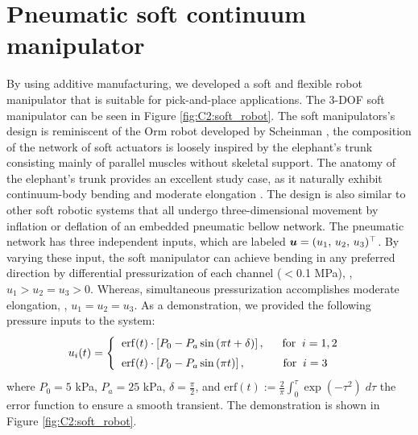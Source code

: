 \section{Pneumatic soft continuum manipulator}
By using additive manufacturing, we developed a soft and flexible robot manipulator that is suitable for pick-and-place applications. The 3-DOF soft manipulator can be seen in Figure \ref{fig:C2:soft_robot}. The soft manipulators's design is reminiscent of the Orm robot developed by Scheinman \cite{BibEntryOrm2019Sep}, the composition of the network of soft actuators is loosely inspired by the elephant's trunk consisting mainly of parallel muscles without skeletal support. The anatomy of the elephant's trunk provides an excellent study case, as it naturally exhibit continuum-body bending and moderate elongation \cite{Falkenhahn2015,Jones2006,Tatlicioglu2007}. The design is also similar to other soft robotic systems \cite{Suzumori1991,Falkenhahn2015,Drotman2017} that all undergo three-dimensional movement by inflation or deflation of an embedded pneumatic bellow network. The pneumatic network has three independent inputs, which are labeled ${\boldsymbol{u}} = (u_1,\,u_2,\,u_3)^\top$. By varying these input, the soft manipulator can achieve bending in any preferred direction by differential pressurization of each channel ($<$0.1 \si{\mega \pascal}), \eg, $u_1 > u_2 = u_3 > 0$. Whereas, simultaneous pressurization accomplishes moderate elongation, \ie, $u_1 = u_2 = u_3$. As a demonstration, we provided the following pressure inputs to the system:
%
\begin{align}
  u_i(t) = \begin{cases}
          \;\;\textup{\textrm{erf}}(t)\cdot \left[P_0 - P_a\sin\left(\pi t + \delta\right)\right], \quad\;\; \textrm{for}\;\; i = 1,2 \\[0.35em]
          \;\;\textup{\textrm{erf}}(t)\cdot \left[P_0 - P_a\sin\left(\pi t \right)\right], \quad\quad\quad\,\, \textrm{for}\;\; i = 3\;\ \\
           \end{cases}
\end{align}
%
where $P_0 = 5$ \si{\kilo \pascal}, $P_a = 25$ \si{\kilo \pascal}, $\delta = \frac{\pi}{2}$, and $\textrm{erf}(t) := \frac{2}{\pi}\int_0^\tau \exp(-\tau^2) \; d\tau$   the error function to ensure a smooth transient. The demonstration is shown in Figure \ref{fig:C2:soft_robot}.

